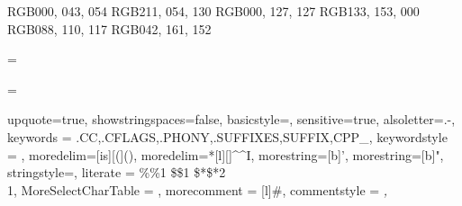 \usepackage{textcomp}
\usepackage{xcolor}
\usepackage{listings}

\definecolor{mktext}    {RGB}{000, 043, 054}
\definecolor{mktarget}  {RGB}{211, 054, 130}
\definecolor{mkstring}  {RGB}{000, 127, 127}
\definecolor{mkkeyword} {RGB}{133, 153, 000}
\definecolor{mkcomment} {RGB}{088, 110, 117}
\definecolor{mkcommand} {RGB}{042, 161, 152}

\newcommand\mktextstyle{\color{mktext}}
\newcommand\mktargetstyle{\color{mktarget}}
\newcommand\mkstringstyle{\color{mkstring}}
\newcommand\mkvariablestyle{\color{mkvariable}}
\newcommand\mkkeywordstyle{\color{mkkeyword}}
\newcommand\mklinecontstyle{\color{mklinecont}}
\newcommand\mkcommentstyle{\slshape\color{mkcomment}}
\newcommand\mkcommandstyle{\color{mkcommand}}

\makeatletter
\newif\iftarget@make@
\newif\iflinecont@make@

{%
  \iflinecont@make@%
    \global\target@make@false%
  \else
    \global\target@make@true%
  \fi
  \global\linecont@make@false%
}

{%
  \ifnum\lst@mode=\lst@Pmode%
      \iftarget@make@%
        \gdef\globalstyle@make{\the@lststyle}%
        \def\lst@thestyle{\mktargetstyle}%
      \fi
    \fi
  \ifnum\lst@mode=\lst@Pmode%
    \lsthk@DetectKeywords%
  \fi
}

{
  upquote=true,
  showstringspaces=false,
  basicstyle=\ttfamily\scriptsize\mktextstyle,
  sensitive=true,
  alsoletter=.-,
  keywords = {.CC,.CFLAGS,.PHONY,.SUFFIXES,SUFFIX,CPP_},
  keywordstyle = \mkkeywordstyle,
  moredelim=[is][\mkvariablestyle(\aftergroup\closingparen@make]{(}{)},
  moredelim=*[l][\mkcommandstyle]{\^^I},
  morestring=[b]',
  morestring=[b]",
  stringstyle=\mkstringstyle,
  literate =
    {\%}{{{\mkvariablestyle\%}}}1
    {\$}{{{\mkvariablestyle\$}}}1
    {\$*}{{{\mkvariablestyle\$*}}}2
    {\\}{{{\mklinecontstyle\lstum@backslash}}}1,
  MoreSelectCharTable =
    \processColon@make
    \processEqual@make
    \processBackslash@make
    \processTab@make,
  morecomment = [l]{\#},
  commentstyle = \mkcommentstyle,
}

\newcommand\closingparen@make{{\mkvariablestyle)}}

